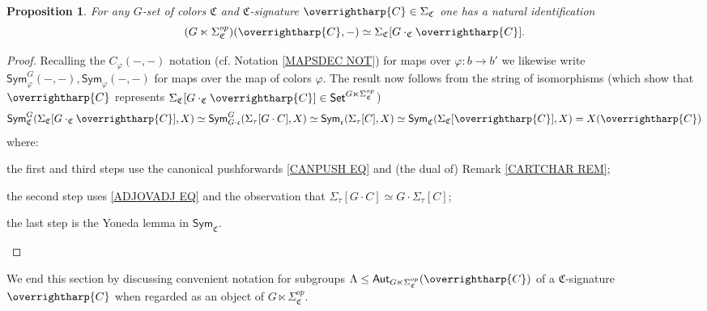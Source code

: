 \documentclass[a4paper,10pt
,draft
]{article}%
\numberwithin{equation}{section}
\numberwithin{figure}{section}
\newtheorem{proposition}[equation]{Proposition}%
\theoremstyle{definition} %
\newcommand{\vect}[1]{\text{\overrightharp{\ensuremath{#1}}}}
\newcommand{\1}{\ensuremath{\mathbbm 1}}%
\begin{document}
\begin{proposition}\label{REPALTDESC PROP}
For any $G$-set of colors $\mathfrak C$
and $\mathfrak{C}$-signature
$\vect{C} \in \Sigma_{\mathfrak{C}}$
one has a natural identification
\[
(G \ltimes \Sigma^{op}_{\mathfrak{C}})(\vect{C},-)
\simeq 
\Sigma_{\mathfrak{C}} [G \cdot_{\mathfrak{C}} \vect{C}].
\]
\end{proposition}

\begin{proof}
Recalling the $C_{\varphi}(-,-)$ notation (cf. Notation \ref{MAPSDEC NOT})
for maps over $\varphi\colon b \to b'$ we likewise write 
$\mathsf{Sym}^G_{\varphi}(-,-),\mathsf{Sym}_{\varphi}(-,-)$
for maps over the map of colors $\varphi$.
The result now follows from the string of isomorphisms
(which show that $\vect{C}$ represents
$\Sigma_{\mathfrak{C}} [G \cdot_{\mathfrak{C}} \vect{C}] \in \mathsf{Set}^{G \ltimes \Sigma^{op}_{\mathfrak{C}}}$)
\[
	\mathsf{Sym}^G_{\mathfrak{C}}
	(\Sigma_{\mathfrak{C}} [G \cdot_{\mathfrak{C}} \vect{C}],X)
\simeq
	\mathsf{Sym}^G_{G \cdot \mathfrak{c}}
	(\Sigma_{\tau} [G \cdot C],X)
\simeq
	\mathsf{Sym}_{\mathfrak{c}}
	(\Sigma_{\tau} [C],X)
\simeq
	\mathsf{Sym}_{\mathfrak{C}}
	(\Sigma_{\mathfrak{C}}[\vect{C}],X)
=
	X(\vect{C})
\]
where: 
\begin{enumerate*}[label=(\roman*)]
\item the first and third steps 
use the canonical pushforwards \eqref{CANPUSH EQ}
and (the dual of) Remark \ref{CARTCHAR REM};
\item
the second step uses \eqref{ADJOVADJ EQ}
and the observation that
$\Sigma_{\tau}[G \cdot C] \simeq G \cdot \Sigma_{\tau}[C]$;
\item the last step is the Yoneda lemma in $\mathsf{Sym}_{\mathfrak{C}}$.
\end{enumerate*}
\end{proof}




We end this section by discussing convenient notation  
for subgroups 
$\Lambda \leq \mathsf{Aut}_{G \ltimes \Sigma_{\mathfrak{C}}^{op}}(\vect{C})$
of a $\mathfrak{C}$-signature $\vect{C}$
when regarded as an object of 
$G \ltimes \Sigma_{\mathfrak{C}}^{op}$.
\end{document}
